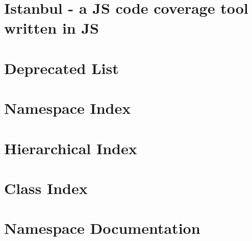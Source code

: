 \documentclass[twoside]{book}
\newcommand{\+}{\discretionary{\mbox{\scriptsize$\hookleftarrow$}}{}{}}
\begin{document}
\chapter{Istanbul -\/ a J\+S code coverage tool written in J\+S}
\label{md__c_1__users_martin__documents__git_hub_visual_studio__bachelor__wis_r__wis_r_node_modules_istanbul__r_e_a_d_m_e}
\hypertarget{md__c_1__users_martin__documents__git_hub_visual_studio__bachelor__wis_r__wis_r_node_modules_istanbul__r_e_a_d_m_e}{}

\chapter{Deprecated List}
\label{deprecated}
\hypertarget{deprecated}{}

\chapter{Namespace Index}

\chapter{Hierarchical Index}

\chapter{Class Index}

\chapter{Namespace Documentation}







\end{document}
